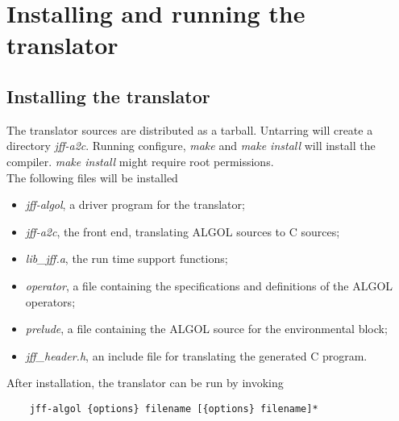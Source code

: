 \documentclass[11pt]{article}
\begin{document}
\section{Installing and running the translator}
\subsection{Installing the translator}
The translator sources are distributed as a tarball.
Untarring will create a directory {\em jff-a2c}.
Running configure, {\em make} and  {\em make install}
will install the compiler. {\em make install} might require root permissions.
\ \\
The following files will be installed
\begin{itemize}
\item {\em jff-algol}, a driver program for the translator;
\item {\em jff-a2c}, the front end, translating ALGOL sources to C sources;
\item {\em lib\_jff.a}, the run time support functions;
\item {\em operator}, a file containing the specifications and definitions of the ALGOL operators;
\item {\em prelude}, a file containing the ALGOL source for the environmental block;
\item {\em jff\_header.h}, an include file for translating the generated C program.
\end{itemize}

After installation, the translator can be run by invoking
\begin{verbatim}
    jff-algol {options} filename [{options} filename]*
\end{verbatim}
\end{document}
